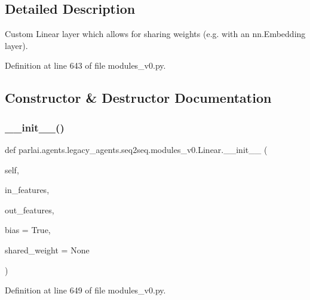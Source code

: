 \subsection{Detailed Description}
\begin{DoxyVerb}Custom Linear layer which allows for sharing weights (e.g. with an nn.Embedding
layer).
\end{DoxyVerb}
 

Definition at line 643 of file modules\+\_\+v0.\+py.



\subsection{Constructor \& Destructor Documentation}
\mbox{\label{classparlai_1_1agents_1_1legacy__agents_1_1seq2seq_1_1modules__v0_1_1Linear_a961944a7bcebe7bee8c32967e505994d}} 
\subsubsection{\texorpdfstring{\+\_\+\+\_\+init\+\_\+\+\_\+()}{\_\_init\_\_()}}
{\footnotesize\ttfamily def parlai.\+agents.\+legacy\+\_\+agents.\+seq2seq.\+modules\+\_\+v0.\+Linear.\+\_\+\+\_\+init\+\_\+\+\_\+ (\begin{DoxyParamCaption}\item[{}]{self,  }\item[{}]{in\+\_\+features,  }\item[{}]{out\+\_\+features,  }\item[{}]{bias = {\ttfamily True},  }\item[{}]{shared\+\_\+weight = {\ttfamily None} }\end{DoxyParamCaption})}



Definition at line 649 of file modules\+\_\+v0.\+py.


